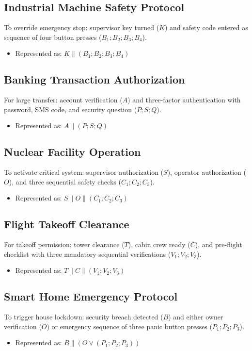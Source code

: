 \subsection*{Industrial Machine Safety Protocol}
To override emergency stop: supervisor key turned ($K$) and safety code entered as sequence of four button presses ($B_1;B_2;B_3;B_4$).
\begin{itemize}
    \item Represented as: $K \parallel (B_1;B_2;B_3;B_4)$
\end{itemize}

\subsection*{Banking Transaction Authorization}
For large transfer: account verification ($A$) and three-factor authentication with password, SMS code, and security question ($P;S;Q$).
\begin{itemize}
    \item Represented as: $A \parallel (P;S;Q)$
\end{itemize}

\subsection*{Nuclear Facility Operation}
To activate critical system: supervisor authorization ($S$), operator authorization ($O$), and three sequential safety checks ($C_1;C_2;C_3$).
\begin{itemize}
    \item Represented as: $S \parallel O \parallel (C_1;C_2;C_3)$
\end{itemize}

\subsection*{Flight Takeoff Clearance}
For takeoff permission: tower clearance ($T$), cabin crew ready ($C$), and pre-flight checklist with three mandatory sequential verifications ($V_1;V_2;V_3$).
\begin{itemize}
    \item Represented as: $T \parallel C \parallel (V_1;V_2;V_3)$
\end{itemize}

\subsection*{Smart Home Emergency Protocol}
To trigger house lockdown: security breach detected ($B$) and either owner verification ($O$) or emergency sequence of three panic button presses ($P_1;P_2;P_3$).
\begin{itemize}
    \item Represented as: $B \parallel (O \vee (P_1;P_2;P_3))$
\end{itemize}

